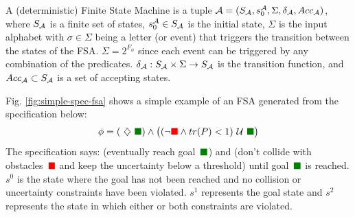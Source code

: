 \documentclass[conference]{IEEEtran}
\newcommand{\sofie}[1]{{\color{purple} [Sofie] #1}}
\begin{document}
\begin{definition}
A (deterministic) Finite State Machine is a tuple $\mathcal{A} = (S_{\mathcal{A}}, s_0^{\mathcal{A}}, \Sigma, \delta_{\mathcal{A}}, Acc_{\mathcal{A}})$, where %
$S_{\mathcal{A}}$ is a finite set of states, $s_0^{\mathcal{A}} \in S_{\mathcal{A}}$ is the initial state,
$\Sigma$ is the input alphabet with $\sigma\in\Sigma$ being a letter (or event) that triggers the transition between the states of the FSA. $\Sigma = 2^{F_\phi}$ since each event can be triggered by any combination of the predicates.
$\delta_{\mathcal{A}} : S_{\mathcal{A}} \times \Sigma \rightarrow S_{\mathcal{A}}$ is the transition function, and
$Acc_{\mathcal{A}}\subset S_{\mathcal{A}}$ is a set of accepting states.
\end{definition}

\newcommand{\goal}{{\color{green!50!black}\blacksquare}}
\newcommand{\obst}{{\color{red}\blacksquare}}


Fig. \ref{fig:simple-spec-fsa} shows a simple example of an FSA generated from the \DTL specification below:
\begin{align}
\label{eq:simple-spec}
\phi = (\Event \goal) \land \big((\neg \obst \land tr(P) < 1) \Until \goal \big)
\end{align}
The specification says: (eventually reach goal~$\goal$) and (don't collide with obstacles~$\obst$ and keep the uncertainty below a threshold) until goal~$\goal$ is reached. $s^0$ is the state where the goal has not been reached and no collision or uncertainty constraints have been violated. $s^1$ represents the goal state and $s^2$ represents the state in which either or both constraints are violated.
\end{document}
